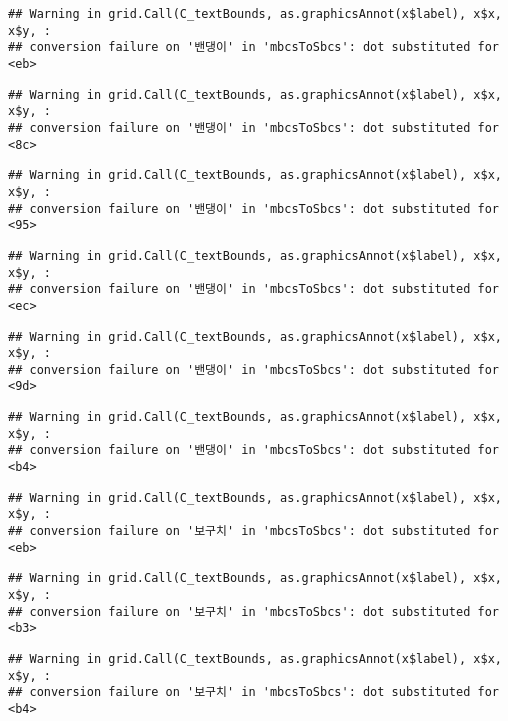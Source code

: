 \documentclass[
]{article}
\begin{document}
\begin{verbatim}
## Warning in grid.Call(C_textBounds, as.graphicsAnnot(x$label), x$x, x$y, :
## conversion failure on '밴댕이' in 'mbcsToSbcs': dot substituted for <eb>
\end{verbatim}

\begin{verbatim}
## Warning in grid.Call(C_textBounds, as.graphicsAnnot(x$label), x$x, x$y, :
## conversion failure on '밴댕이' in 'mbcsToSbcs': dot substituted for <8c>
\end{verbatim}

\begin{verbatim}
## Warning in grid.Call(C_textBounds, as.graphicsAnnot(x$label), x$x, x$y, :
## conversion failure on '밴댕이' in 'mbcsToSbcs': dot substituted for <95>
\end{verbatim}

\begin{verbatim}
## Warning in grid.Call(C_textBounds, as.graphicsAnnot(x$label), x$x, x$y, :
## conversion failure on '밴댕이' in 'mbcsToSbcs': dot substituted for <ec>
\end{verbatim}

\begin{verbatim}
## Warning in grid.Call(C_textBounds, as.graphicsAnnot(x$label), x$x, x$y, :
## conversion failure on '밴댕이' in 'mbcsToSbcs': dot substituted for <9d>
\end{verbatim}

\begin{verbatim}
## Warning in grid.Call(C_textBounds, as.graphicsAnnot(x$label), x$x, x$y, :
## conversion failure on '밴댕이' in 'mbcsToSbcs': dot substituted for <b4>
\end{verbatim}

\begin{verbatim}
## Warning in grid.Call(C_textBounds, as.graphicsAnnot(x$label), x$x, x$y, :
## conversion failure on '보구치' in 'mbcsToSbcs': dot substituted for <eb>
\end{verbatim}

\begin{verbatim}
## Warning in grid.Call(C_textBounds, as.graphicsAnnot(x$label), x$x, x$y, :
## conversion failure on '보구치' in 'mbcsToSbcs': dot substituted for <b3>
\end{verbatim}

\begin{verbatim}
## Warning in grid.Call(C_textBounds, as.graphicsAnnot(x$label), x$x, x$y, :
## conversion failure on '보구치' in 'mbcsToSbcs': dot substituted for <b4>
\end{verbatim}
\end{document}
